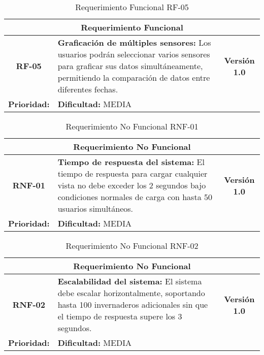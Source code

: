 \begin{table}[h]
\centering
\begin{tabular}{|c|p{10cm}|c|}
\hline
\multicolumn{3}{|c|}{\textbf{Requerimiento Funcional}} \\ \hline
\textbf{RF-05} & \textbf{Graficación de múltiples sensores:} Los usuarios podrán seleccionar varios sensores para graficar sus datos simultáneamente, permitiendo la comparación de datos entre diferentes fechas. & \textbf{Versión 1.0} \\ \hline
\multicolumn{1}{|l|}{\textbf{Prioridad:}} MEDIA & \multicolumn{2}{l|}{\textbf{Dificultad:} MEDIA} \\ \hline
\end{tabular}
\caption{Requerimiento Funcional RF-05}
\end{table}
\renewcommand{\arraystretch}{1.5} %
\begin{table}[h]
\centering
\begin{tabular}{|c|p{10cm}|c|}
\hline
\multicolumn{3}{|c|}{\textbf{Requerimiento No Funcional}} \\ \hline
\textbf{RNF-01} & \textbf{Tiempo de respuesta del sistema:} El tiempo de respuesta para cargar cualquier vista no debe exceder los 2 segundos bajo condiciones normales de carga con hasta 50 usuarios simultáneos. & \textbf{Versión 1.0} \\ \hline
\multicolumn{1}{|l|}{\textbf{Prioridad:}} ALTA & \multicolumn{2}{l|}{\textbf{Dificultad:} MEDIA} \\ \hline
\end{tabular}
\caption{Requerimiento No Funcional RNF-01}
\end{table}
\vspace{1cm} %

\begin{table}[h]
\centering
\begin{tabular}{|c|p{10cm}|c|}
\hline
\multicolumn{3}{|c|}{\textbf{Requerimiento No Funcional}} \\ \hline
\textbf{RNF-02} & \textbf{Escalabilidad del sistema:} El sistema debe escalar horizontalmente, soportando hasta 100 invernaderos adicionales sin que el tiempo de respuesta supere los 3 segundos. & \textbf{Versión 1.0} \\ \hline
\multicolumn{1}{|l|}{\textbf{Prioridad:}} ALTA & \multicolumn{2}{l|}{\textbf{Dificultad:} MEDIA} \\ \hline
\end{tabular}
\caption{Requerimiento No Funcional RNF-02}
\end{table}
\vspace{1cm} %

